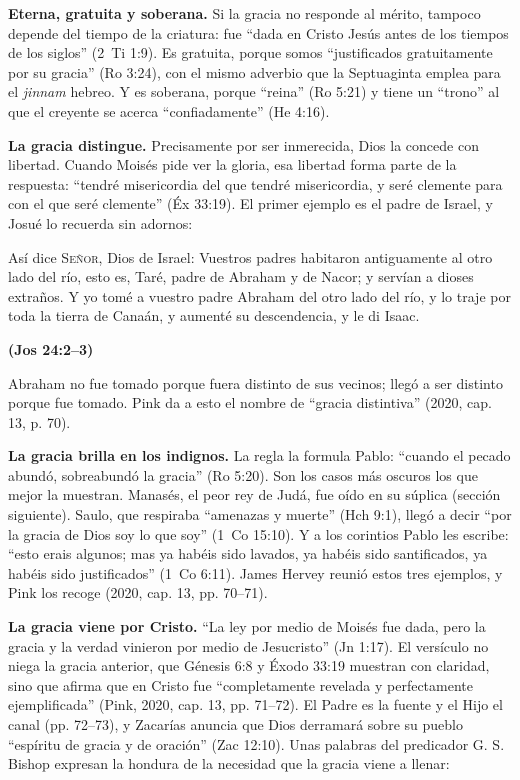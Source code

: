\documentclass[11pt,letterpaper]{article}
\newcommand{\SENOR}{\textsc{Señor}}
\newcommand{\fuente}[1]{\par\hfill{\upshape\bfseries\small\textcolor{azul}{#1}}}
\begin{document}
\textbf{Eterna, gratuita y soberana.} Si la gracia no responde al mérito, tampoco depende del tiempo de la criatura: fue ``dada en Cristo Jesús antes de los tiempos de los siglos'' (2~Ti 1:9). Es gratuita, porque somos ``justificados gratuitamente por su gracia'' (Ro 3:24), con el mismo adverbio que la Septuaginta emplea para el \emph{jinnam} hebreo. Y es soberana, porque ``reina'' (Ro 5:21) y tiene un ``trono'' al que el creyente se acerca ``confiadamente'' (He 4:16).

\textbf{La gracia distingue.} Precisamente por ser inmerecida, Dios la concede con libertad. Cuando Moisés pide ver la gloria, esa libertad forma parte de la respuesta: ``tendré misericordia del que tendré misericordia, y seré clemente para con el que seré clemente'' (Éx 33:19). El primer ejemplo es el padre de Israel, y Josué lo recuerda sin adornos:

\begin{cita}Así dice \SENOR, Dios de Israel: Vuestros padres habitaron antiguamente al otro lado del río, esto es, Taré, padre de Abraham y de Nacor; y servían a dioses extraños. Y yo tomé a vuestro padre Abraham del otro lado del río, y lo traje por toda la tierra de Canaán, y aumenté su descendencia, y le di Isaac.\fuente{(Jos 24:2--3)}\end{cita}

Abraham no fue tomado porque fuera distinto de sus vecinos; llegó a ser distinto porque fue tomado. Pink da a esto el nombre de ``gracia distintiva'' (2020, cap. 13, p. 70).

\textbf{La gracia brilla en los indignos.} La regla la formula Pablo: ``cuando el pecado abundó, sobreabundó la gracia'' (Ro 5:20). Son los casos más oscuros los que mejor la muestran. Manasés, el peor rey de Judá, fue oído en su súplica (sección siguiente). Saulo, que respiraba ``amenazas y muerte'' (Hch 9:1), llegó a decir ``por la gracia de Dios soy lo que soy'' (1~Co 15:10). Y a los corintios Pablo les escribe: ``esto erais algunos; mas ya habéis sido lavados, ya habéis sido santificados, ya habéis sido justificados'' (1~Co 6:11). James Hervey reunió estos tres ejemplos, y Pink los recoge (2020, cap. 13, pp. 70--71).

\textbf{La gracia viene por Cristo.} ``La ley por medio de Moisés fue dada, pero la gracia y la verdad vinieron por medio de Jesucristo'' (Jn 1:17). El versículo no niega la gracia anterior, que Génesis 6:8 y Éxodo 33:19 muestran con claridad, sino que afirma que en Cristo fue ``completamente revelada y perfectamente ejemplificada'' (Pink, 2020, cap. 13, pp. 71--72). El Padre es la fuente y el Hijo el canal (pp. 72--73), y Zacarías anuncia que Dios derramará sobre su pueblo ``espíritu de gracia y de oración'' (Zac 12:10). Unas palabras del predicador G. S. Bishop expresan la hondura de la necesidad que la gracia viene a llenar:
\end{document}

